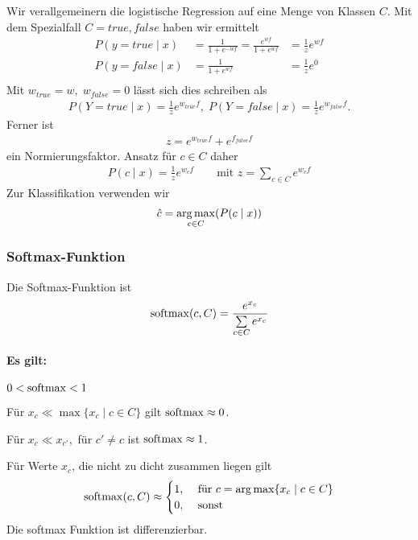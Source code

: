 Wir verallgemeinern die logistische Regression auf eine Menge von Klassen $C$.
Mit dem Spezialfall $C={true,false}$ haben wir ermittelt
\begin{align*}
    P(y=true\mid
    x)&=\frac{1}{1+e^{-wf}}=\frac{e^{wf}}{1+e^{wf}} &=\frac{1}{z}e^{wf}\\
    P(y=false\mid
    x)&=\frac{1}{1+e^{wf}} &=\frac{1}{z}e^{0}\\
\end{align*}
Mit $w_{true} = w,\; w_{false}=0$ lässt sich dies schreiben als
\begin{align*}
    P(Y=true\mid x)=\frac{1}{z}e^{w_{true}f},\; P(Y=false\mid
    x)=\frac{1}{z}e^{w_{false}f}.
\end{align*}
Ferner ist
\begin{align*}
    z=e^{w_{true}f}+e^{f_{false}f}
\end{align*}
ein Normierungsfaktor.
Ansatz für $c\in C$ daher
\begin{align*}
    P(c\mid x)=\frac{1}{z}e^{w_cf} \qquad \text{mit } z=\sum\limits_{c\in
        C}e^{w_cf}
\end{align*}
Zur Klassifikation verwenden wir
\begin{align*}
    \hat c =\operatorname*{arg\,max}_{c\in C}(P(c\mid x))
\end{align*}

\subsubsection{Softmax-Funktion}
\label{ssub:softmax_funktion}

Die Softmax-Funktion ist
\begin{align*}
    \operatorname*{softmax}(c,C)= \frac{e^{x_c}}{\sum\limits_{c\in C}e^{x_c}}
\end{align*}
\paragraph{Es gilt:}
\label{par:es_gilt_}
$0 < \operatorname*{softmax} < 1$

Für $x_c \ll \max\{x_c\mid c\in C\}$ gilt $\operatorname*{softmax} \approx 0$.

Für $x_c \ll x_{c'},$ für $c' \neq c$ ist $\operatorname*{softmax} \approx 1$.

Für Werte $x_c$, die nicht zu dicht zusammen liegen gilt
\begin{align*}
\operatorname*{softmax}(c,C)
\approx \begin{cases}1,& \text{ für }c=\operatorname*{arg\,max}\{x_c\mid c\in C\}\\
0, & \text{ sonst }\end{cases}
\end{align*}
Die softmax Funktion ist differenzierbar.

